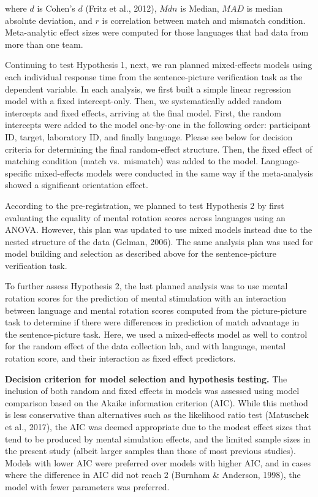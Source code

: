 \documentclass[
  man,floatsintext]{apa7}
\begin{document}
where \(d\) is Cohen's \(d\) (Fritz et al., 2012), \(Mdn\) is Median, \(MAD\) is median
absolute deviation, and \(r\) is correlation between match and mismatch
condition. Meta-analytic effect sizes were computed for those languages
that had data from more than one team.

Continuing to test Hypothesis 1, next, we ran planned mixed-effects
models using each individual response time from the sentence-picture
verification task as the dependent variable. In each analysis, we first
built a simple linear regression model with a fixed intercept-only.
Then, we systematically added random intercepts and fixed effects,
arriving at the final model. First, the random intercepts were added to
the model one-by-one in the following order: participant ID, target,
laboratory ID, and finally language. Please see below for decision
criteria for determining the final random-effect structure. Then, the
fixed effect of matching condition (match vs.~mismatch) was added to the
model. Language-specific mixed-effects models were conducted in the same
way if the meta-analysis showed a significant orientation effect.

According to the pre-registration, we planned to test Hypothesis 2 by
first evaluating the equality of mental rotation scores across languages
using an ANOVA. However, this plan was updated to use mixed models
instead due to the nested structure of the data (Gelman, 2006). The same
analysis plan was used for model building and selection as described
above for the sentence-picture verification task.

To further assess Hypothesis 2, the last planned analysis was to use
mental rotation scores for the prediction of mental stimulation with an
interaction between language and mental rotation scores computed from
the picture-picture task to determine if there were differences in
prediction of match advantage in the sentence-picture task. Here, we
used a mixed-effects model as well to control for the random effect of
the data collection lab, and with language, mental rotation score, and
their interaction as fixed effect predictors.

\textbf{Decision criterion for model selection and hypothesis testing.} The
inclusion of both random and fixed effects in models was assessed using
model comparison based on the Akaike information criterion (AIC). While
this method is less conservative than alternatives such as the
likelihood ratio test (Matuschek et al., 2017), the AIC was deemed appropriate
due to the modest effect sizes that tend to be produced by mental
simulation effects, and the limited sample sizes in the present study
(albeit larger samples than those of most previous studies). Models with
lower AIC were preferred over models with higher AIC, and in cases where
the difference in AIC did not reach 2 (Burnham \& Anderson, 1998), the model with
fewer parameters was preferred.
\end{document}
